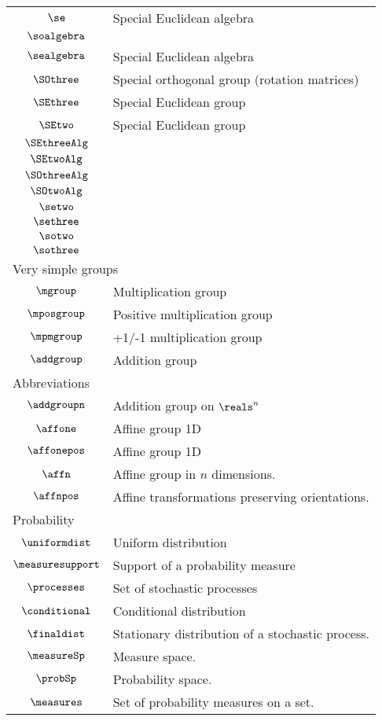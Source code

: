 \begin{longtable}{cl}
 $\se$ &  Special Euclidean algebra\\ 
 $\soalgebra$ & \\ 
 $\sealgebra$ &  Special Euclidean algebra\\ 
 $\SOthree$ &  Special orthogonal group (rotation matrices)\\ 
 $\SEthree$ &  Special Euclidean group \\ 
 $\SEtwo$ &  Special Euclidean group \\ 
 $\SEthreeAlg$ & \\ 
 $\SEtwoAlg$ & \\ 
 $\SOthreeAlg$ & \\ 
 $\SOtwoAlg$ & \\ 
 $\setwo$ & \\ 
 $\sethree$ & \\ 
 $\sotwo$ & \\ 
 $\sothree$ & \\ 
 \multicolumn{2}{l}{Very simple groups}\\ 
 \hline
$\mgroup$ &  Multiplication group\\ 
 $\mposgroup$ &  Positive multiplication group\\ 
 $\mpmgroup$ &  +1/-1 multiplication group\\ 
 $\addgroup$ &  Addition group\\ 
 \multicolumn{2}{l}{Abbreviations}\\ 
 \hline
$\addgroupn$ &  Addition group on $\reals^n$\\ 
 $\affone$ &  Affine group 1D\\ 
 $\affonepos$ &  Affine group 1D\\ 
 $\affn$ &  Affine group in $n$ dimensions.\\ 
 $\affnpos$ &  Affine transformations preserving orientations.\\ 
 \multicolumn{2}{l}{Probability}\\ 
 \hline
$\uniformdist$ &  Uniform distribution\\ 
 $\measuresupport$ &  Support of a probability measure\\ 
 $\processes$ &  Set of stochastic processes\\ 
 $\conditional$ &  Conditional distribution\\ 
 $\finaldist$ &  Stationary distribution of a stochastic process.\\ 
 $\measureSp$ &  Measure space.\\ 
 $\probSp$ &  Probability space.\\ 
 $\measures$ &  Set of probability measures on a set.\\ 

\end{longtable}
